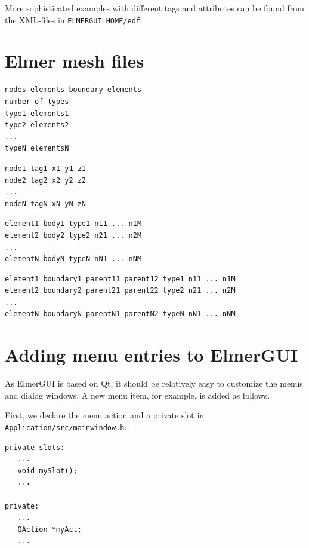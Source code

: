 More sophisticated examples with different tags and attributes can be found from the XML-files in  {\tt ELMERGUI\_HOME/edf}.

\newpage

\chapter{Elmer mesh files}

\begin{verbatim}
nodes elements boundary-elements
number-of-types
type1 elements1
type2 elements2
...
typeN elementsN
\end{verbatim}

\vskip5mm

\begin{verbatim}
node1 tag1 x1 y1 z1
node2 tag2 x2 y2 z2
...
nodeN tagN xN yN zN
\end{verbatim}

\vskip5mm

\begin{verbatim}
element1 body1 type1 n11 ... n1M
element2 body2 type2 n21 ... n2M
...
elementN bodyN typeN nN1 ... nNM
\end{verbatim}

\vskip5mm

\begin{verbatim}
element1 boundary1 parent11 parent12 type1 n11 ... n1M
element2 boundary2 parent21 parent22 type2 n21 ... n2M
...
elementN boundaryN parentN1 parentN2 typeN nN1 ... nNM
\end{verbatim}

\newpage

\chapter{Adding menu entries to ElmerGUI}

As ElmerGUI is based on Qt, it should be relatively easy to customize the menus
and dialog windows. A new menu item, for example, is added as follows.

First, we declare the menu action and a private slot in {\tt Application/src/mainwindow.h}:
\begin{verbatim}
private slots:
   ...
   void mySlot();
   ...

private:
   ...
   QAction *myAct;
   ...
\end{verbatim}

